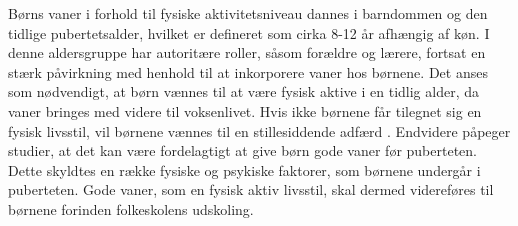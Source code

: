 Børns vaner i forhold til fysiske aktivitetsniveau dannes i barndommen og den tidlige pubertetsalder, hvilket er defineret som cirka 8-12 år afhængig af køn. I denne aldersgruppe har autoritære roller, såsom forældre og lærere, fortsat en stærk påvirkning med henhold til at inkorporere vaner hos børnene. \citep{F.SallisG.Simons-MortonJ.Stone1992,Wied2011,L.MeyerP.Gullotta2012} \newline
Det anses som nødvendigt, at børn vænnes til at være fysisk aktive i en tidlig alder, da vaner bringes med videre til voksenlivet. Hvis ikke børnene får tilegnet sig en fysisk livsstil, vil børnene vænnes til en stillesiddende adfærd \citep{L.MeyerP.Gullotta2012,Nabe-NielsenSundhedsministerietetal.2005,P.J.KremersBrug2008}. Endvidere påpeger studier, at det kan være fordelagtigt at give børn gode vaner før puberteten. Dette skyldtes en række fysiske og psykiske faktorer, som børnene undergår i puberteten. Gode vaner, som en fysisk aktiv livsstil, skal dermed videreføres til børnene forinden folkeskolens udskoling. \citep{L.MeyerP.Gullotta2012,F.SallisG.Simons-MortonJ.Stone1992,P.J.KremersBrug2008}

